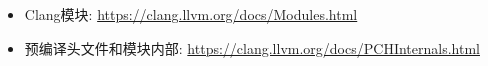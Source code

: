 \begin{itemize}
\item
Clang模块: \url{https://clang.llvm.org/docs/Modules.html}

\item
预编译头文件和模块内部: \url{https://clang.llvm.org/docs/PCHInternals.html}
\end{itemize}